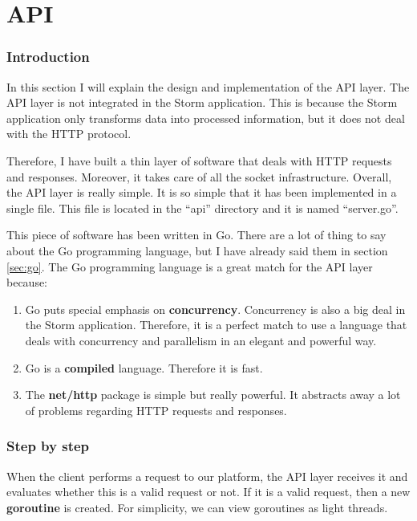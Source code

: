  
\section{\ac{API}}
\label{sec:implementation_api}

\subsubsection*{Introduction}

In this section I will explain the design and implementation of the \ac{API}
layer. The \ac{API} layer is not integrated in the Storm application. This is
because the Storm application only transforms data into processed information,
but it does not deal with the HTTP protocol.

Therefore, I have built a thin layer of software that deals with HTTP requests
and responses. Moreover, it takes care of all the socket infrastructure.
Overall, the \ac{API} layer is really simple. It is so simple that it has been
implemented in a single file. This file is located in the ``api'' directory and
it is named ``server.go''.

This piece of software has been written in Go. There are a lot of thing to say
about the Go programming language, but I have already said them in section
\ref{sec:go}. The Go programming language is a great match for the \ac{API}
layer because:

\begin{enumerate}
  \item Go puts special emphasis on {\bf concurrency}. Concurrency is also a
big deal in the Storm application. Therefore, it is a perfect match to use a
language that deals with concurrency and parallelism in an elegant and powerful
way.
  \item Go is a {\bf compiled} language. Therefore it is fast.
  \item The {\bf net/http} package is simple but really powerful. It abstracts
away a lot of problems regarding HTTP requests and responses.
\end{enumerate}

\subsubsection*{Step by step}

When the client performs a request to our platform, the \ac{API} layer receives
it and evaluates whether this is a valid request or not. If it is a valid
request, then a new {\bf goroutine} is created. For simplicity, we can view
goroutines as light threads.

